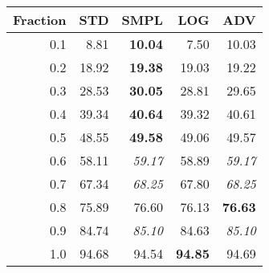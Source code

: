 \documentclass{standalone}
\begin{document}
\begin{tabular}{r|rrrr}
      \toprule
      Fraction & STD & SMPL & LOG & ADV\\
      \midrule
      0.1 & 8.81 & \textbf{10.04} & 7.50 & 10.03\\
  0.2 & 18.92 & \textbf{19.38} & 19.03 & 19.22\\
  0.3 & 28.53 & \textbf{30.05} & 28.81 & 29.65\\
  0.4 & 39.34 & \textbf{40.64} & 39.32 & 40.61\\
  0.5 & 48.55 & \textbf{49.58} & 49.06 & 49.57\\
  0.6 & 58.11 & \emph{59.17} & 58.89 & \emph{59.17}\\
  0.7 & 67.34 & \emph{68.25} & 67.80 & \emph{68.25}\\
  0.8 & 75.89 & 76.60 & 76.13 & \textbf{76.63}\\
  0.9 & 84.74 & \emph{85.10} & 84.63 & \emph{85.10}\\
  1.0 & 94.68 & 94.54 & \textbf{94.85} & 94.69\\
  \bottomrule
\end{tabular}
\end{document}
